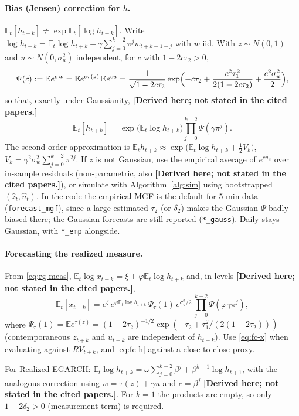 \documentclass[11pt]{article}
\newcommand{\E}{\mathbb{E}}
\newcommand{\derived}{\textbf{[Derived here; not stated in the cited papers.]}}
\begin{document}
\paragraph{Bias (Jensen) correction for $h$.} $\E_t[h_{t+k}]\neq\exp\E_t[\log h_{t+k}]$. Write
$\log h_{t+k}=\E_t\log h_{t+k}+\gamma\sum_{j=0}^{k-2}\pi^j w_{t+k-1-j}$ with $w$ iid. With
$z\sim N(0,1)$ and $u\sim N(0,\sigma_u^2)$ independent, for $c$ with $1-2c\tau_2>0$,
\begin{equation}\label{eq:mgf}
\Psi(c):=\E e^{c\,w}=\E e^{c\tau(z)}\,\E e^{cu}
=\frac{1}{\sqrt{1-2c\tau_2}}\exp\Bigl(-c\tau_2+\frac{c^2\tau_1^2}{2(1-2c\tau_2)}+\frac{c^2\sigma_u^2}{2}\Bigr),
\end{equation}
so that, exactly under Gaussianity, \derived
\begin{equation}\label{eq:fc-h}
\E_t[h_{t+k}] = \exp\bigl(\E_t\log h_{t+k}\bigr)\prod_{j=0}^{k-2}\Psi(\gamma\pi^j) .
\end{equation}
The second-order approximation is $\E_t h_{t+k}\approx\exp\bigl(\E_t\log h_{t+k}+\tfrac12 V_k\bigr)$,
$V_k=\gamma^2\sigma_w^2\sum_{j=0}^{k-2}\pi^{2j}$. If $z$ is not Gaussian, use the empirical
average of $e^{c\hat w_t}$ over in-sample residuals (non-parametric, also \derived), or simulate
with Algorithm~\ref{alg:sim} using bootstrapped $(\hat z_t,\hat u_t)$.
In the code the empirical MGF is the default for 5-min data (\texttt{forecast\_mgf}), since a large
estimated $\tau_2$ (or $\delta_2$) makes the Gaussian $\Psi$ badly biased there; the Gaussian
forecasts are still reported (\texttt{*\_gauss}). Daily stays Gaussian, with \texttt{*\_emp} alongside.

\paragraph{Forecasting the realized measure.} From \eqref{eq:rg-meas},
$\E_t\log x_{t+k}=\xi+\varphi\E_t\log h_{t+k}$ and, in levels \derived,
\begin{equation}\label{eq:fc-x}
\E_t[x_{t+k}] = e^{\xi}\,e^{\varphi\E_t\log h_{t+k}}\,\Psi_\tau(1)\,e^{\sigma_u^2/2}\,
\prod_{j=0}^{k-2}\Psi(\varphi\gamma\pi^j),
\end{equation}
where $\Psi_\tau(1)=\E e^{\tau(z)}=(1-2\tau_2)^{-1/2}\exp(-\tau_2+\tau_1^2/(2(1-2\tau_2)))$
(contemporaneous $z_{t+k}$ and $u_{t+k}$ are independent of $h_{t+k}$). Use \eqref{eq:fc-x}
when evaluating against $RV_{t+k}$, and \eqref{eq:fc-h} against a close-to-close proxy.

For Realized EGARCH: $\E_t\log h_{t+k}=\omega\sum_{j=0}^{k-2}\beta^j+\beta^{k-1}\log h_{t+1}$,
with the analogous correction using $w=\tau(z)+\gamma u$ and $c=\beta^j$ \derived.
For $k=1$ the products are empty, so only $1-2\delta_2>0$ (measurement term) is required.
\end{document}
